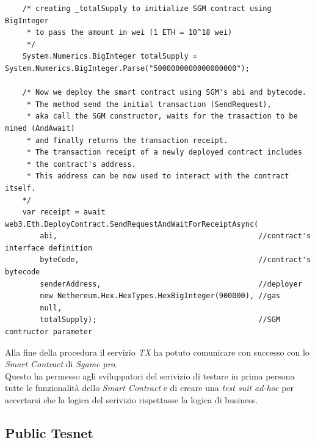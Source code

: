 \documentclass[11pt]{thesistemp}
\begin{document}
\begin{itemize}
\begin{lstlisting}
    /* creating _totalSupply to initialize SGM contract using BigInteger 
     * to pass the amount in wei (1 ETH = 10^18 wei)
     */
    System.Numerics.BigInteger totalSupply = System.Numerics.BigInteger.Parse("5000000000000000000");

    /* Now we deploy the smart contract using SGM's abi and bytecode.
     * The method send the initial transaction (SendRequest), 
     * aka call the SGM constructor, waits for the trasaction to be mined (AndAwait)
     * and finally returns the transaction receipt.
     * The transaction receipt of a newly deployed contract includes
     * the contract's address.
     * This address can be now used to interact with the contract itself. 
    */
    var receipt = await web3.Eth.DeployContract.SendRequestAndWaitForReceiptAsync(
        abi,                                              //contract's interface definition
        byteCode,                                         //contract's  bytecode
        senderAddress,                                    //deployer
        new Nethereum.Hex.HexTypes.HexBigInteger(900000), //gas
        null,
        totalSupply);                                     //SGM contructor parameter

	\end{lstlisting}
\end{itemize}
Alla fine della procedura il servizio \textit{TX} ha potuto comunicare con successo con lo \textit{Smart Contract} di \textit{Sgame pro}.\\
Questo ha permesso agli sviluppatori del serivizio di testare in prima persona tutte le funzionalità dello \textit{Smart Contract} e di creare una \textit{test suit ad-hoc} per accertarsi che la logica del serivizio rispettasse la logica di business.
\pagebreak

\subsection{Public Tesnet}
\end{document}
